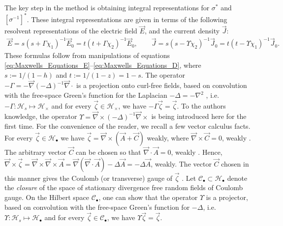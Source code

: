 \documentclass[english,12pt,jmp,graphicx]{revtex4-1}
\begin{document}
The key step in the method is obtaining integral representations for
$\sigma^*$ and $[\sigma^{-1}]^*$. These integral representations are given in
terms of the following resolvent representations of the electric field
$\vec{E}$, and the current density $\vec{J}$:  
%
\begin{align}\label{eq:Resolvent_representations_E_D}
  \vec{E}=s(s+\Gamma\chi_1)^{-1}\vec{E}_0=t(t+\Gamma\chi_2)^{-1}\vec{E}_0,\qquad
  \vec{J}=s(s-\Upsilon\chi_2)^{-1}\vec{J}_0=t(t-\Upsilon\chi_1)^{-1}\vec{J}_0.
\end{align}
%
These formulas follow from manipulations of equations
\eqref{eq:Maxwells_Equations_E}--\eqref{eq:Maxwells_Equations_D}, where
$s:=1/(1-h)$ and $t:=1/(1-z)=1-s$. The operator
$-\Gamma=-\vec{\nabla}(-\Delta)^{-1}\vec{\nabla}\cdot$ is a projection onto curl-free fields,
based on convolution with the free-space Green's function for the
Laplacian $-\Delta=-\nabla^2$ \cite{Golden:CMP-473},
i.e. $-\Gamma:\mathscr{H}_s\mapsto\mathscr{H}_\times$ and for every
$\vec{\zeta}\in\mathscr{H}_\times$, we have $-\Gamma\vec{\zeta}=\vec{\zeta}$. To the authors 
knowledge, the operator $\Upsilon=\vec{\nabla}\times(-\Delta)^{-1}\vec{\nabla}\times$ is being
introduced here for the first time. For the convenience of the reader,
we recall a few vector calculus facts. For every
$\vec{\zeta}\in\mathscr{H}_\bullet$ we have $\vec{\zeta}=\vec{\nabla}\times(\vec{A}+\vec{C})$
weakly, where $\vec{\nabla}\times\vec{C}=0$, weakly \cite{Jackson-1999}. The
arbitrary vector $\vec{C}$ can be chosen so that $\vec{\nabla}\cdot\vec{A}=0$,
weakly \cite{Jackson-1999}. Hence,
$\vec{\nabla}\times\vec{\zeta}=\vec{\nabla}\times\vec{\nabla}\times\vec{A}
=\vec{\nabla}(\vec{\nabla}\cdot\vec{A})-\Delta\vec{A}=-\Delta\vec{A}$, weakly. The vector
$\vec{C}$ chosen in this manner gives the Coulomb (or transverse)
gauge of $\vec{\zeta}$ \cite{Jackson-1999}. Let
$\mathscr{C}_{\bullet}\subset\mathscr{H}_{\bullet}$ denote the \emph{closure} of the
space of stationary divergence free random fields of Coulomb gauge. On
the Hilbert space $\mathscr{C}_{\bullet}$, one can show that the
operator $\Upsilon$ is a projector, based on convolution with the
free-space Green's function for $-\Delta$,
i.e. $\Upsilon:\mathscr{H}_s\mapsto\mathscr{H}_\bullet$ and for every
$\vec{\zeta}\in\mathscr{C}_\bullet$, we have $\Upsilon\vec{\zeta}=\vec{\zeta}$. 
\end{document}
